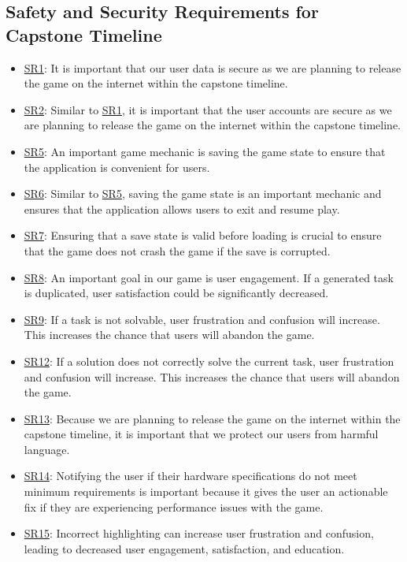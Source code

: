 \documentclass{article}
\begin{document}
\subsection{Safety and Security Requirements for Capstone Timeline}

\begin{itemize}
    \item \hyperref[req:SR1]{SR1}: It is important that our user data is secure as we are planning to release the game on the internet within the capstone timeline.
    \item \hyperref[req:SR2]{SR2}: Similar to \hyperref[req:SR1]{SR1}, it is important that the user accounts are secure as we are planning to release the game on the internet within the capstone timeline.
    \item \hyperref[req:SR5]{SR5}: An important game mechanic is saving the game state to ensure that the application is convenient for users.
    \item \hyperref[req:SR6]{SR6}: Similar to \hyperref[req:SR5]{SR5}, saving the game state is an important mechanic and ensures that the application allows users to exit and resume play.
    \item \hyperref[req:SR7]{SR7}: Ensuring that a save state is valid before loading is crucial to ensure that the game does not crash the game if the save is corrupted.
    \item \hyperref[req:SR8]{SR8}: An important goal in our game is user engagement. If a generated task is duplicated, user satisfaction could be significantly decreased.
    \item \hyperref[req:SR9]{SR9}: If a task is not solvable, user frustration and confusion will increase. This increases the chance that users will abandon the game.
    \item \hyperref[req:SR12]{SR12}: If a solution does not correctly solve the current task, user frustration and confusion will increase. This increases the chance that users will abandon the game.
    \item \hyperref[req:SR13]{SR13}: Because we are planning to release the game on the internet within the capstone timeline, it is important that we protect our users from harmful language.
    \item \hyperref[req:SR14]{SR14}: Notifying the user if their hardware specifications do not meet minimum requirements is important because it gives the user an actionable fix if they are experiencing performance issues with the game.
    \item \hyperref[req:SR15]{SR15}: Incorrect highlighting can increase user frustration and confusion, leading to decreased user engagement, satisfaction, and education.

\end{itemize}
\end{document}
